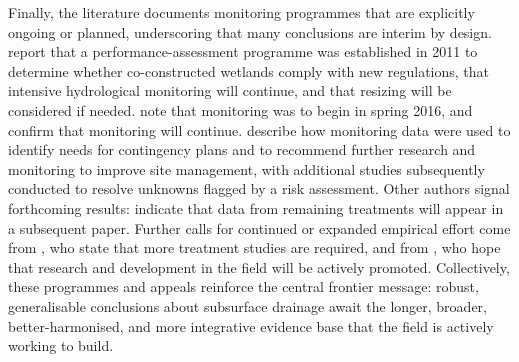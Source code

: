 \documentclass[11pt]{article}
\begin{document}
Finally, the literature documents monitoring programmes that are explicitly ongoing or planned, underscoring that many conclusions are interim by design. \textcite{Tournebize2012} report that a performance-assessment programme was established in 2011 to determine whether co-constructed wetlands comply with new regulations, that intensive hydrological monitoring will continue, and that resizing will be considered if needed. \textcite{Kjaersgaard2016} note that monitoring was to begin in spring 2016, and \textcite{Ali2001} confirm that monitoring will continue. \textcite{Ohlendorf2002} describe how monitoring data were used to identify needs for contingency plans and to recommend further research and monitoring to improve site management, with additional studies subsequently conducted to resolve unknowns flagged by a risk assessment. Other authors signal forthcoming results: \textcite{Drury2014} indicate that data from remaining treatments will appear in a subsequent paper. Further calls for continued or expanded empirical effort come from \textcite{Rekha2011}, who state that more treatment studies are required, and from \textcite{Ogino2007}, who hope that research and development in the field will be actively promoted. Collectively, these programmes and appeals reinforce the central frontier message: robust, generalisable conclusions about subsurface drainage await the longer, broader, better-harmonised, and more integrative evidence base that the field is actively working to build.

\printbibliography
\end{document}
